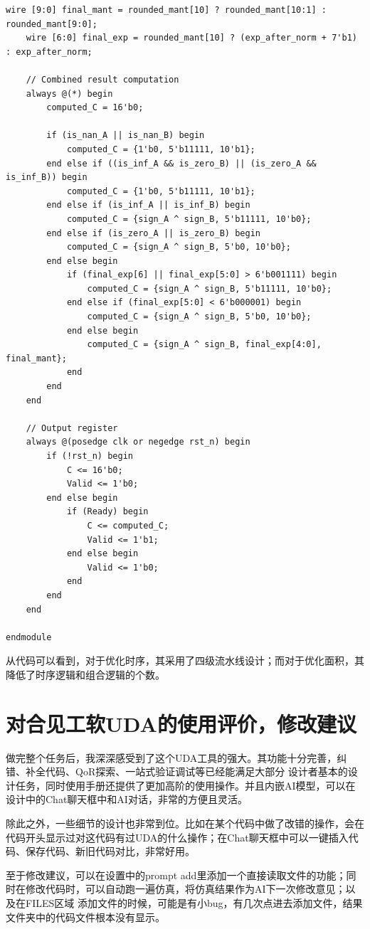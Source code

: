 \documentclass[UTF8]{ctexart}
\begin{document}
\begin{lstlisting}[frame=shadowbox,caption=fp\_multiplier\_generated3.sv]
    wire [9:0] final_mant = rounded_mant[10] ? rounded_mant[10:1] : rounded_mant[9:0];
    wire [6:0] final_exp = rounded_mant[10] ? (exp_after_norm + 7'b1) : exp_after_norm;
    
    // Combined result computation
    always @(*) begin
        computed_C = 16'b0;
        
        if (is_nan_A || is_nan_B) begin
            computed_C = {1'b0, 5'b11111, 10'b1};
        end else if ((is_inf_A && is_zero_B) || (is_zero_A && is_inf_B)) begin
            computed_C = {1'b0, 5'b11111, 10'b1};
        end else if (is_inf_A || is_inf_B) begin
            computed_C = {sign_A ^ sign_B, 5'b11111, 10'b0};
        end else if (is_zero_A || is_zero_B) begin
            computed_C = {sign_A ^ sign_B, 5'b0, 10'b0};
        end else begin
            if (final_exp[6] || final_exp[5:0] > 6'b001111) begin
                computed_C = {sign_A ^ sign_B, 5'b11111, 10'b0};
            end else if (final_exp[5:0] < 6'b000001) begin
                computed_C = {sign_A ^ sign_B, 5'b0, 10'b0};
            end else begin
                computed_C = {sign_A ^ sign_B, final_exp[4:0], final_mant};
            end
        end
    end
    
    // Output register
    always @(posedge clk or negedge rst_n) begin
        if (!rst_n) begin
            C <= 16'b0;
            Valid <= 1'b0;
        end else begin
            if (Ready) begin
                C <= computed_C;
                Valid <= 1'b1;
            end else begin
                Valid <= 1'b0;
            end
        end
    end

endmodule
\end{lstlisting}

从代码可以看到，对于优化时序，其采用了四级流水线设计；而对于优化面积，其降低了时序逻辑和组合逻辑的个数。
\section{对合见工软UDA的使用评价，修改建议}
做完整个任务后，我深深感受到了这个UDA工具的强大。其功能十分完善，纠错、补全代码、QoR探索、一站式验证调试等已经能满足大部分
设计者基本的设计任务，同时使用手册还提供了更加高阶的使用操作。并且内嵌AI模型，可以在设计中的Chat聊天框中和AI对话，非常的方便且灵活。

除此之外，一些细节的设计也非常到位。比如在某个代码中做了改错的操作，会在代码开头显示过对这代码有过UDA的什么操作；在Chat聊天框中可以一键插入代码、保存代码、新旧代码对比，非常好用。

至于修改建议，可以在设置中的prompt add里添加一个直接读取文件的功能；同时在修改代码时，可以自动跑一遍仿真，将仿真结果作为AI下一次修改意见；以及在FILES区域
添加文件的时候，可能是有小bug，有几次点进去添加文件，结果文件夹中的代码文件根本没有显示。
\end{document}
